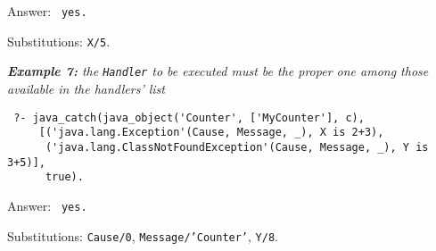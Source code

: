 Answer: \texttt{ yes.}

Substitutions: \texttt{X/5}.

\medskip
\textit{\textbf{Example 7:} the \textit{\texttt{Handler}} to be executed must be the proper one
among those available in the handlers' list}
\begin{verbatim}
 ?- java_catch(java_object('Counter', ['MyCounter'], c),
     [('java.lang.Exception'(Cause, Message, _), X is 2+3),
      ('java.lang.ClassNotFoundException'(Cause, Message, _), Y is 3+5)],
      true).
\end{verbatim}

Answer: \texttt{ yes.}

Substitutions: \texttt{Cause/0}, \texttt{Message/'Counter'}, \texttt{Y/8}.




